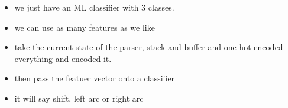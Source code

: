 \documentclass[11pt]{article}
\begin{document}
\begin{minipage}[l]{.5\linewidth}
    \begin{figure}[H]
        \centering
    \end{figure}    
\end{minipage}\hfill
\begin{minipage}[r]{.48\linewidth}
    \begin{itemize}
        \item we just have an ML classifier with 3 classes.
        \item we can use as many features as we like
    \end{itemize}
\end{minipage}

\begin{minipage}[l]{.5\linewidth}
    \begin{figure}[H]
        \centering
    \end{figure}    
\end{minipage}\hfill
\begin{minipage}[r]{.48\linewidth}
    \begin{itemize}
        \item take the current state of the parser, stack and buffer and one-hot encoded everything and encoded it.
        \item then pass the featuer vector onto a classifier
        \item it will say shift, left arc or right arc
    \end{itemize}
\end{minipage}
\end{document}
